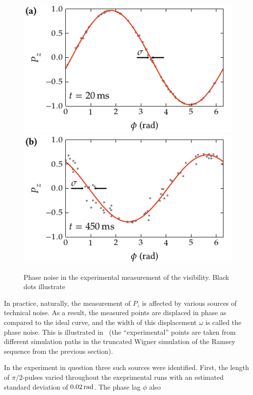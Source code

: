 \begin{figure}
    \centerline{%
    \includegraphics{figures_generated/bec_noise/illustration_noise_20ms.pdf}%
    \includegraphics{figures_generated/bec_noise/illustration_noise_450ms.pdf}}

    \caption{Phase noise in the experimental measurement of the visibility.
    Black dots illustrate }

    \label{fig:bec-noise:phase-noise:illustration}
\end{figure}

In practice, naturally, the measurement of $P_z$ is affected by various sources of technical noise.
As a result, the measured points are displaced in phase as compared to the ideal curve, and the width of this displacement $\omega$ is called the phase noise.
This is illustrated in~ (the ``experimental'' points are taken from different simulation paths in the truncated Wigner simulation of the Ramsey sequence from the previous section).

In the experiment in question three such sources were identified.
First, the length of $\pi/2$-pulses varied throughout the exeprimental runs with an estimated standard deviation of $0.02\mbox{\ensuremath{\,\mathrm{rad}}}$.
The phase lag $\phi$ also

